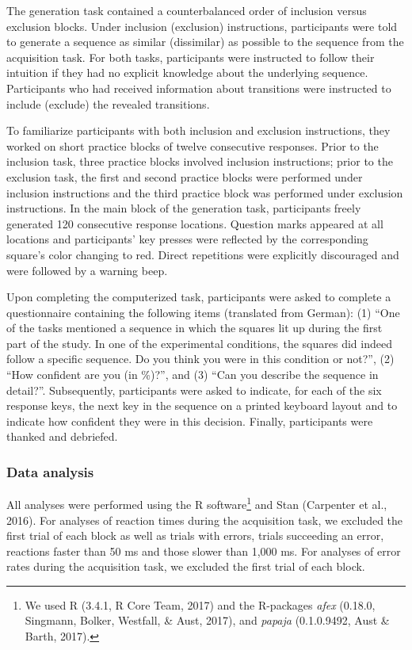 \documentclass[man]{apa6}
\theoremstyle{definition}
\theoremstyle{definition}
\theoremstyle{definition}
\theoremstyle{remark}
\begin{document}
The generation task contained a counterbalanced order of inclusion
versus exclusion blocks. Under inclusion (exclusion) instructions,
participants were told to generate a sequence as similar (dissimilar) as
possible to the sequence from the acquisition task. For both tasks,
participants were instructed to follow their intuition if they had no
explicit knowledge about the underlying sequence. Participants who had
received information about transitions were instructed to include
(exclude) the revealed transitions.

To familiarize participants with both inclusion and exclusion
instructions, they worked on short practice blocks of twelve consecutive
responses. Prior to the inclusion task, three practice blocks involved
inclusion instructions; prior to the exclusion task, the first and
second practice blocks were performed under inclusion instructions and
the third practice block was performed under exclusion instructions. In
the main block of the generation task, participants freely generated 120
consecutive response locations. Question marks appeared at all locations
and participants' key presses were reflected by the corresponding
square's color changing to red. Direct repetitions were explicitly
discouraged and were followed by a warning beep.

Upon completing the computerized task, participants were asked to
complete a questionnaire containing the following items (translated from
German): (1) \enquote{One of the tasks mentioned a sequence in which the
squares lit up during the first part of the study. In one of the
experimental conditions, the squares did indeed follow a specific
sequence. Do you think you were in this condition or not?}, (2)
\enquote{How confident are you (in \%)?}, and (3) \enquote{Can you
describe the sequence in detail?}. Subsequently, participants were asked
to indicate, for each of the six response keys, the next key in the
sequence on a printed keyboard layout and to indicate how confident they
were in this decision. Finally, participants were thanked and debriefed.

\subsubsection{Data analysis}\label{data-analysis}

All analyses were performed using the R software\footnote{We used R
  (3.4.1, R Core Team, 2017) and the R-packages \emph{afex} (0.18.0,
  Singmann, Bolker, Westfall, \& Aust, 2017), and \emph{papaja}
  (0.1.0.9492, Aust \& Barth, 2017).} and Stan (Carpenter et al., 2016).
For analyses of reaction times during the acquisition task, we excluded
the first trial of each block as well as trials with errors, trials
succeeding an error, reactions faster than 50 ms and those slower than
1,000 ms. For analyses of error rates during the acquisition task, we
excluded the first trial of each block.
\end{document}
